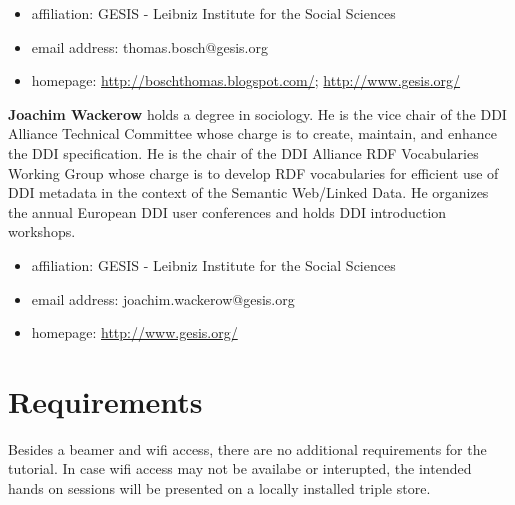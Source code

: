 \documentclass{llncs}
\begin{document}
\begin{itemize}
  \item affiliation: GESIS - Leibniz Institute for the Social Sciences
  \item email address: thomas.bosch@gesis.org
	\item homepage: \url{http://boschthomas.blogspot.com/}; \url{http://www.gesis.org/}
\end{itemize}

\textbf{Joachim Wackerow} holds a degree in sociology. 
He is the vice chair of the DDI Alliance Technical Committee whose charge is to create, maintain, and enhance the DDI specification.
He is the chair of the DDI Alliance RDF Vocabularies Working Group whose charge is to develop RDF vocabularies for efficient use of DDI metadata in the context of the Semantic Web/Linked Data.
He organizes the annual European DDI user conferences and holds DDI introduction workshops.

\begin{itemize}
  \item affiliation: GESIS - Leibniz Institute for the Social Sciences
  \item email address: joachim.wackerow@gesis.org
	\item homepage: \url{http://www.gesis.org/}
\end{itemize}



\section{Requirements}

Besides a beamer and wifi access, there are no additional requirements for the tutorial. In case wifi access may not be availabe or interupted, the intended hands on sessions will be presented on a locally installed triple store.
\end{document}
